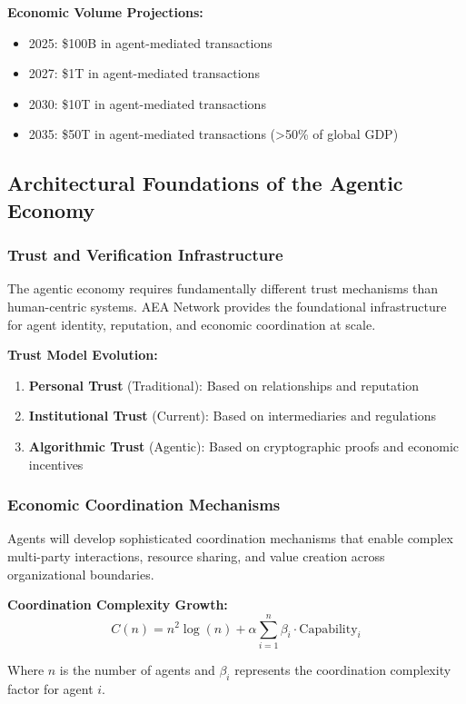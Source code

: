 \documentclass[12pt,a4paper]{article}
\begin{document}
\textbf{Economic Volume Projections:}
\begin{itemize}
\item 2025: \$100B in agent-mediated transactions
\item 2027: \$1T in agent-mediated transactions
\item 2030: \$10T in agent-mediated transactions
\item 2035: \$50T in agent-mediated transactions (>50\% of global GDP)
\end{itemize}

\subsection{Architectural Foundations of the Agentic Economy}

\subsubsection{Trust and Verification Infrastructure}

The agentic economy requires fundamentally different trust mechanisms than human-centric systems. AEA Network provides the foundational infrastructure for agent identity, reputation, and economic coordination at scale.

\textbf{Trust Model Evolution:}
\begin{enumerate}
\item \textbf{Personal Trust} (Traditional): Based on relationships and reputation
\item \textbf{Institutional Trust} (Current): Based on intermediaries and regulations
\item \textbf{Algorithmic Trust} (Agentic): Based on cryptographic proofs and economic incentives
\end{enumerate}

\subsubsection{Economic Coordination Mechanisms}

Agents will develop sophisticated coordination mechanisms that enable complex multi-party interactions, resource sharing, and value creation across organizational boundaries.

\textbf{Coordination Complexity Growth:}
$$C(n) = n^2 \log(n) + \alpha \sum_{i=1}^n \beta_i \cdot \text{Capability}_i$$

Where $n$ is the number of agents and $\beta_i$ represents the coordination complexity factor for agent $i$.
\end{document}
